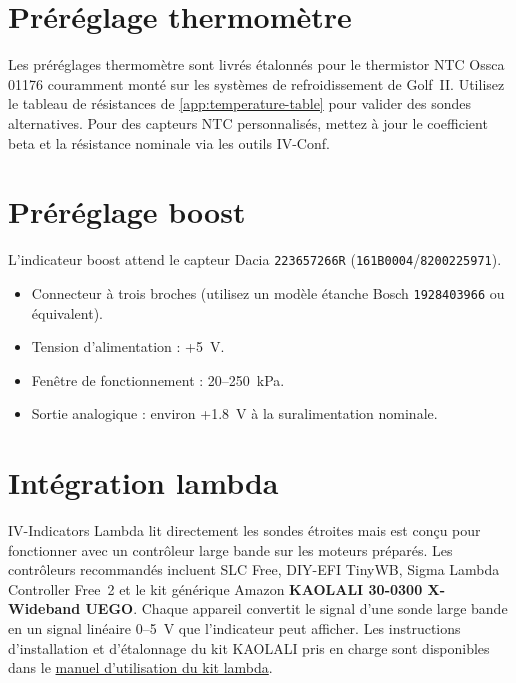 \section{Préréglage thermomètre}
Les préréglages thermomètre sont livrés étalonnés pour le thermistor NTC Ossca\,01176 couramment monté sur les systèmes de refroidissement de Golf~II. Utilisez le tableau de résistances de \autoref{app:temperature-table} pour valider des sondes alternatives. Pour des capteurs NTC personnalisés, mettez à jour le coefficient beta et la résistance nominale via les outils IV-Conf.

\section{Préréglage boost}
L'indicateur boost attend le capteur Dacia \texttt{223657266R} (\texttt{161B0004}/\texttt{8200225971}).
\begin{itemize}
    \item Connecteur à trois broches (utilisez un modèle étanche Bosch \texttt{1928403966} ou équivalent).
    \item Tension d'alimentation : +5~V.
    \item Fenêtre de fonctionnement : 20--250~kPa.
    \item Sortie analogique : environ +1.8~V à la suralimentation nominale.
\end{itemize}

\section{Intégration lambda}
IV-Indicators Lambda lit directement les sondes étroites mais est conçu pour fonctionner avec un contrôleur large bande sur les moteurs préparés. Les contrôleurs recommandés incluent SLC Free, DIY-EFI TinyWB, Sigma Lambda Controller Free~2 et le kit générique Amazon \textbf{KAOLALI 30-0300 X-Wideband UEGO}. Chaque appareil convertit le signal d'une sonde large bande en un signal linéaire 0--5~V que l'indicateur peut afficher. Les instructions d'installation et d'étalonnage du kit KAOLALI pris en charge sont disponibles dans le \href{https://github.com/PHOL-LABS/IV_NANO_UserManual/blob/master/lambda_kit_user_manual.pdf}{manuel d'utilisation du kit lambda}.

